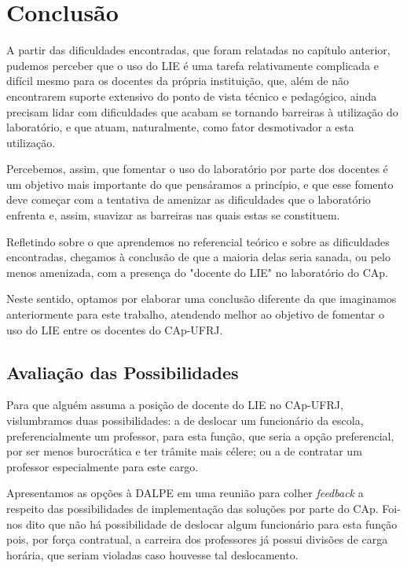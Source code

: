 \chapter{Conclusão}\label{chp:LABEL_CHP_CONC}


A partir das dificuldades encontradas, que foram relatadas no capítulo anterior, pudemos perceber que o uso do LIE é uma tarefa relativamente complicada e difícil mesmo para os docentes da própria instituição, que, além de não encontrarem suporte extensivo do ponto de vista técnico e pedagógico, ainda precisam lidar com dificuldades que acabam se tornando barreiras à utilização do laboratório, e que atuam, naturalmente, como fator desmotivador a esta utilização.

Percebemos, assim, que fomentar o uso do laboratório por parte dos docentes é um objetivo mais importante do que pensáramos a princípio, e que esse fomento deve começar com a tentativa de amenizar as dificuldades que o laboratório enfrenta e, assim, suavizar as barreiras nas quais estas se constituem.

Refletindo sobre o que aprendemos no referencial teórico e sobre as dificuldades encontradas, chegamos à conclusão de que a maioria delas seria sanada, ou pelo menos amenizada, com a presença do "docente do LIE" no laboratório do CAp.

Neste sentido, optamos por elaborar uma conclusão diferente da que imaginamos anteriormente para este trabalho, atendendo melhor ao objetivo de fomentar o uso do LIE entre os docentes do CAp-UFRJ.

\section{Avaliação das Possibilidades}\label{chp:LABEL_CHP_CONC_SEC_POSS}

Para que alguém assuma a posição de docente do LIE no CAp-UFRJ, vislumbramos duas possibilidades: a de deslocar um funcionário da escola, preferencialmente um professor, para esta função, que seria a opção preferencial, por ser menos burocrática e ter trâmite mais célere; ou a de contratar um professor especialmente para este cargo.

Apresentamos as opções à DALPE em uma reunião para colher \textit{feedback} a respeito das possibilidades de implementação das soluções por parte do CAp. Foi-nos dito que não há possibilidade de deslocar algum funcionário para esta função pois, por força contratual, a carreira dos professores já possui divisões de carga horária, que seriam violadas caso houvesse tal deslocamento.

